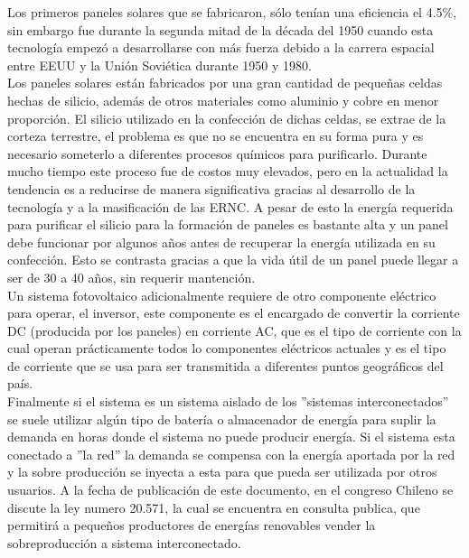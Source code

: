 Los primeros paneles solares que se fabricaron, sólo tenían una eficiencia el 4.5\%, sin embargo fue durante la segunda mitad de la década del 1950 cuando esta tecnología empezó a desarrollarse con más fuerza debido a la carrera espacial entre EEUU y la Unión Soviética durante 1950 y 1980.\\

Los paneles solares están fabricados por una gran cantidad de pequeñas celdas hechas de silicio, además de otros materiales como aluminio y cobre en menor proporción. El silicio utilizado en la confección de dichas celdas, se extrae de la corteza terrestre, el problema es que no se encuentra en su forma pura y es necesario someterlo a diferentes procesos químicos para purificarlo. Durante mucho tiempo este proceso fue de costos muy elevados, pero en la actualidad la tendencia es a reducirse de manera significativa gracias al desarrollo de la tecnología y a la masificación de las ERNC. A pesar de esto la energía requerida para purificar el silicio para la formación de paneles es bastante alta y un panel debe funcionar por algunos años antes de recuperar la energía utilizada en su confección. Esto se contrasta gracias a que la vida útil de un panel puede llegar a ser de 30 a 40 años, sin requerir mantención.\\

Un sistema fotovoltaico adicionalmente requiere de otro componente eléctrico para operar, el inversor, este componente es el encargado de convertir la corriente DC (producida por los paneles) en corriente AC, que es el tipo de corriente con la cual operan prácticamente todos lo componentes eléctricos actuales y es el tipo de corriente que se usa para ser transmitida a diferentes puntos geográficos del país.\\

Finalmente si el sistema es un sistema aislado de los ''sistemas interconectados'' se suele utilizar algún tipo de batería o almacenador de energía para suplir la demanda en horas donde el sistema no puede producir energía. Si el sistema esta conectado a ''la red'' la demanda se compensa con la energía aportada por la red y la sobre producción se inyecta a esta para que pueda ser utilizada por otros usuarios. A la fecha de publicación de este documento, en el congreso Chileno se discute la ley numero 20.571, la cual se encuentra en consulta publica, que permitirá a pequeños productores de energías renovables vender la sobreproducción a sistema interconectado.

